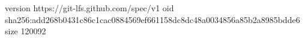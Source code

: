 version https://git-lfs.github.com/spec/v1
oid sha256:add268b0431c86c1cac0884569ef661158dc8dc48a0034856a85b2a8985bdde6
size 120092
